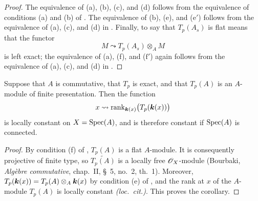 \begin{proof}
The equivalence of (a), (b), (c), and (d) follows from the
equivalence of conditions (a) and (b) of .
The equivalence of (b), (e), and ($\mathrm{e}'$) follows from
the equivalence of (a), (c), and (d) in .
Finally, to say that $T_p(A_s)$ is flat means that the functor
\[
  M\leadsto T_p(A_s)\otimes_A M
\]
is left exact; the equivalence of (a), (f), and
($\mathrm{f}'$) again follows from the equivalence of (a), (c),
and (d) in .
\end{proof}


\begin{corollary}[7.3.4]
\label{III.7.3.4}
Suppose that $A$ is commutative, that $T_p$ is exact, and that
$T_p(A)$ is an $A$-module of finite presentation.  Then the
function
\[
  x\leadsto
  \operatorname{rank}_{\boldsymbol{k}(x)}
  \bigl(T_p(\boldsymbol{k}(x))\bigr)
\]
is locally constant on $X=\operatorname{Spec}(A)$, and is therefore constant
if $\operatorname{Spec}(A)$ is connected.
\end{corollary}

\begin{proof}
By condition (f) of , $T_p(A)$ is a flat
$A$-module.  It is consequently projective of finite type, so
$\widetilde{T_p(A)}$ is a locally free $\mathscr{O}_X$-module
(Bourbaki, \emph{Alg\`ebre commutative}, chap.~II, \S~5,
no.~2, th.~1).  Moreover, $T_p(\boldsymbol{k}(x))
=
T_p(A)\otimes_A\boldsymbol{k}(x)$
by condition (e) of , and the rank at $x$ of
the $A$-module $T_p(A)$ is locally constant
\emph{(loc.\ cit.)}.  This proves the corollary.
\end{proof}

